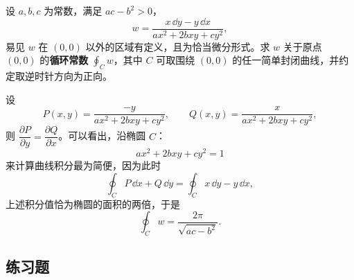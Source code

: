 \begin{xexample}[24.3.6]
设 $a,b,c$ 为常数，满足 $ac-b^2>0$，
\[
  w=\frac{x\,\dd y-y\,\dd x}{ax^2+2bxy+cy^2},
\]
易见 $w$ 在 $(0,0)$ 以外的区域有定义，且为恰当微分形式。求 $w$ 关于原点 $(0,0)$ 的\textbf{循环常数} $\displaystyle\oint_Cw$，其中 $C$ 可取围绕 $(0,0)$ 的任一简单封闭曲线，并约定取逆时针方向为正向。
\end{xexample}
\begin{xsolution}
设
\[
  P(x,y)=\frac{-y}{ax^2+2bxy+cy^2},\qquad
  Q(x,y)=\frac{x}{ax^2+2bxy+cy^2},
\]
则 $\dfrac{\partial P}{\partial y}=\dfrac{\partial Q}{\partial x}$。可以看出，沿椭圆 $C$：
\[
  ax^2+2bxy+cy^2=1
\]
来计算曲线积分最为简便，因为此时
\[
  \oint_CP\,\dd x+Q\,\dd y=\oint_Cx\,\dd y-y\,\dd x,
\]
上述积分值恰为椭圆的面积的两倍，于是
\[
  \oint_Cw=\frac{2\pi}{\sqrt{ac-b^2}}.
\]
\end{xsolution}

\subsection{练习题}

